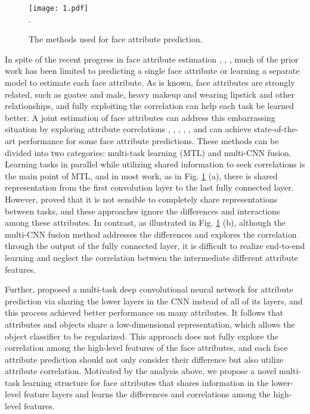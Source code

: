 \documentclass{sig-alternate-05-2015}
\begin{document}
\begin{figure}[t]
\centering
\setlength{\fboxsep}{0pt}
\setlength{\fboxrule}{0pt}
\texttt{[image: 1.pdf]} \\
\DeclareGraphicsExtensions.
\caption{The methods used for face attribute prediction. }
\label{fig:1}
\end{figure}



In spite of the recent progress in face attribute estimation \cite{Kwon1994Age}, \cite{8082561}, \cite{Rothe2016Deep}, much of the prior work has been limited to predicting a single face attribute or learning a separate model to estimate each face attribute. As is known, face attributes are strongly related, such as goatee and male, heavy makeup and wearing lipstick and other relationships, and fully exploiting the correlation can help each task be learned better. A joint estimation of face attributes can address this embarrassing situation by exploring attribute correlations \cite{7410782}, \cite{7254184}, \cite{ehrlich2016facial}, \cite{8170321}, \cite{Han2017Heterogeneous}, and can achieve state-of-the-art performance for some face attribute predictions. These methods can be divided into two categories: multi-task learning (MTL) and multi-CNN fusion. Learning tasks in parallel while utilizing shared information to seek correlations is the main point of MTL, and in most work, as in Fig. \ref{fig:1} (a), there is shared representation from the first convolution layer to the last fully connected layer. However, \cite{misra2016cross} proved that it is not sensible to completely share representations between tasks, and these approaches ignore the differences and interactions among these attributes. In contrast, as illustrated in Fig. \ref{fig:1} (b), although the multi-CNN fusion method addresses the differences and explores the correlation through the output of the fully connected layer, it is difficult to realize end-to-end learning and neglect the correlation between the intermediate different attribute features.


Further, \cite{hand2017attributes} proposed a multi-task deep convolutional neural network for attribute prediction via sharing the lower layers in the CNN instead of all of its layers, and this process achieved better performance on many attributes. It follows that attributes and objects share a low-dimensional representation, which allows the object classifier to be regularized\cite{5995543}. This approach does not fully explore the correlation among the high-level features of the face attributes, and each face attribute prediction should not only consider their difference but also utilize attribute correlation. Motivated by the analysis above, we propose a novel multi-task learning structure for face attributes that shares information in the lower-level feature layers and learns the differences and correlations among the high-level features.
\end{document}
